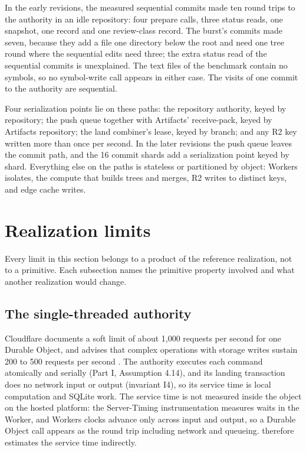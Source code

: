 \documentclass[11pt,letterpaper]{article}
\theoremstyle{definition}
\theoremstyle{remark}
\begin{document}
In the early revisions, the measured sequential commits made ten round trips to the authority in an idle repository: four prepare calls, three status reads, one snapshot, one record and one review-class record. %
The burst's commits made seven, because they add a file one directory below the root and need one tree round where the sequential edits need three; the extra status read of the sequential commits is unexplained. %
The text files of the benchmark contain no symbols, so no symbol-write call appears in either case. The visits of one commit to the authority are sequential.

Four serialization points lie on these paths: the repository authority, keyed by repository; the push queue together with Artifacts' receive-pack, keyed by Artifacts repository; the land combiner's lease, keyed by branch; and any R2 key written more than once per second. In the later revisions the push queue leaves the commit path, and the 16 commit shards add a serialization point keyed by shard. Everything else on the paths is stateless or partitioned by object: Workers isolates, the compute that builds trees and merges, R2 writes to distinct keys, and edge cache writes.

\section{Realization limits}
\label{sec:sgoc:limits}

Every limit in this section belongs to a product of the reference realization, not to a primitive. Each subsection names the primitive property involved and what another realization would change.

\subsection{The single-threaded authority}

Cloudflare documents a soft limit of about 1,000 requests per second for one Durable Object, and advises that complex operations with storage writes sustain 200 to 500 requests per second \cite{cfdolimits,cfdorules}. The authority executes each command atomically and serially (Part I, Assumption 4.14), and its landing transaction does no network input or output (invariant I4), so its service time is local computation and SQLite work. The service time is not measured inside the object on the hosted platform: the Server-Timing instrumentation measures waits in the Worker, and Workers clocks advance only across input and output, so a Durable Object call appears as the round trip including network and queueing.  therefore estimates the service time indirectly.
\end{document}
